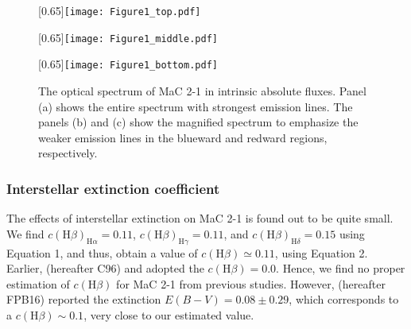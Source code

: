 \documentclass[a4paper,fleqn,usenatbib]{mnras}
\begin{document}
\begin{figure}
\centering
\scalebox{0.65}[0.65]{\texttt{[image: Figure1\_top.pdf]}}

\scalebox{0.65}[0.65]{\texttt{[image: Figure1\_middle.pdf]}}

\scalebox{0.65}[0.65]{\texttt{[image: Figure1\_bottom.pdf]}}
 \caption{The optical spectrum of MaC 2-1 in intrinsic absolute fluxes. Panel (a) shows the entire spectrum with strongest emission lines. The panels (b) and (c) show the magnified spectrum to emphasize the weaker emission lines in the blueward and redward regions, respectively. \label{fig:specoptmac2-1}}
\end{figure} 

\subsubsection{Interstellar extinction coefficient}
The effects of interstellar extinction on MaC 2-1 is found out to be quite small. We find $c(\mathrm{H}\beta)_{\mathrm{H}\alpha}=0.11$, $c(\mathrm{H}\beta)_{\mathrm{H}\gamma}=0.11$, and $c(\mathrm{H}\beta)_{\mathrm{H}\delta}=0.15$ using Equation 1, and thus, obtain a value of $c(\mathrm{H}\beta)\simeq0.11$, using Equation 2. Earlier, \citet{1996A&A...307..215C} (hereafter C96) and \citet{2013MNRAS.431....2F} adopted the $c(\mathrm{H}\beta)=0.0$. Hence, we find no proper estimation of $c(\mathrm{H}\beta)$ for MaC 2-1 from previous studies. However, \citet{2016MNRAS.455.1459F} (hereafter FPB16) reported the extinction $E(B-V)=0.08\pm0.29$, which corresponds to a $c(\mathrm{H}\beta)\sim0.1$, very close to our estimated value.    
\end{document}
